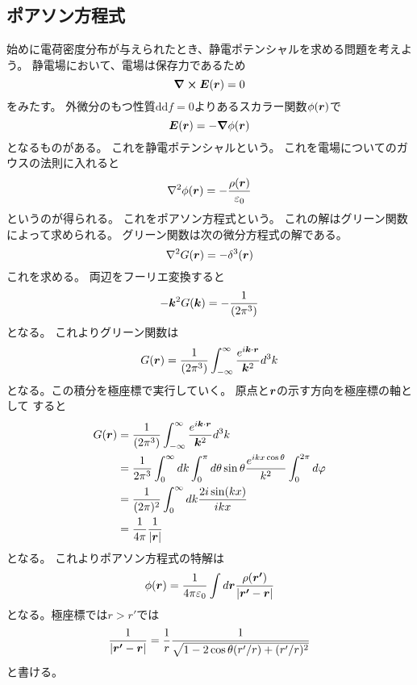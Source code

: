 \documentclass[../../master.tex]{subfiles}
\begin{document}
\subsection{ポアソン方程式}
始めに電荷密度分布が与えられたとき、静電ポテンシャルを求める問題を考えよう。
静電場において、電場は保存力であるため
\begin{equation}
	\curl \vb*{E}(\vb*{r}) = 0
\end{equation}
をみたす。
外微分のもつ性質\(\text{dd}f=0\)よりあるスカラー関数\(\phi(\vb*{r})\)で
\begin{equation}
	\vb*{E}(\vb*{r})= -\grad \phi(\vb*{r})
\end{equation}
となるものがある。
これを静電ポテンシャルという。
これを電場についてのガウスの法則に入れると
\begin{equation}
	\laplacian \phi(\vb*{r}) = -\frac{\rho(\vb*{r})}{\varepsilon_0}
\end{equation}
というのが得られる。
これをポアソン方程式という。
これの解はグリーン関数によって求められる。
グリーン関数は次の微分方程式の解である。
\begin{equation}
	\laplacian G(\vb*{r}) = -\delta^3(\vb*{r})
\end{equation}
これを求める。
両辺をフーリエ変換すると
\begin{equation}
	-\vb*{k}^2G(\vb*{k}) = -\frac{1}{(2\pi^3)}
\end{equation}
となる。
これよりグリーン関数は
\begin{equation}
	G(\vb*{r})=\frac{1}{(2\pi^3)}\int_{-\infty}^{\infty} \frac{e^{i\vb*{k}\cdot\vb*{r}}}{\vb*{k}^2}d^3k
\end{equation}
となる。この積分を極座標で実行していく。
原点と\(\vb*{r}\)の示す方向を極座標の軸として
すると
\begin{align*}
	G(\vb*{r}) & =\frac{1}{(2\pi^3)}\int_{-\infty}^{\infty} \frac{e^{i\vb*{k}\cdot\vb*{r}}}{\vb*{k}^2}d^3k                                  \\
	           & =\frac{1}{2\pi^3}\int_{0}^{\infty}dk \int_{0}^{\pi}d\theta \sin\theta \frac{e^{ikx\cos\theta}}{k^2}\int_{0}^{2\pi}d\varphi \\
	           & =\frac{1}{(2\pi)^2}\int_{0}^{\infty}dk \frac{2i\sin(kx)}{ikx}                                                              \\
	           & =\frac{1}{4\pi}\frac{1}{\abs{\vb*{r}}}
\end{align*}
となる。
これよりポアソン方程式の特解は
\begin{equation}
	\phi(\vb*{r}) = \frac{1}{4\pi\varepsilon_0}\int d\vb*{r}
	\frac{\rho(\vb*{r'})}{\abs{\vb*{r'}-\vb*{r}}}
\end{equation}
となる。極座標では\(r>r'\)では
\begin{equation}
	\frac{1}{\abs{\vb*{r'}-\vb*{r}}} = \frac{1}{r}\frac{1}{\sqrt{1-2\cos\theta(r'/r) + (r'/r)^2}}
\end{equation}
と書ける。
\end{document}

